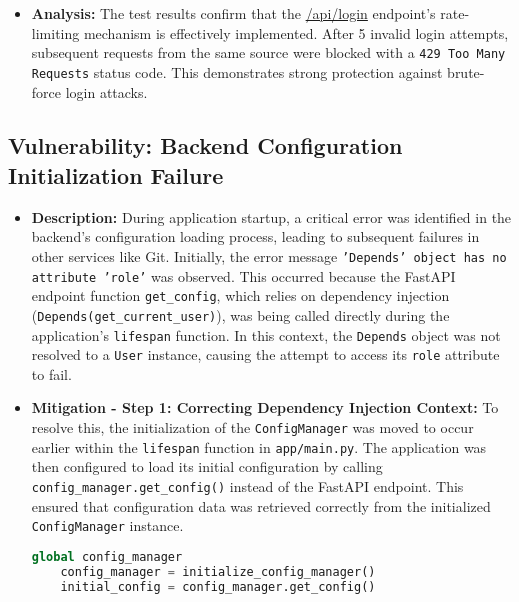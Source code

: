 \documentclass{article}
\begin{document}
\begin{itemize}
    \item \textbf{Analysis:}
    The test results confirm that the \url{/api/login} endpoint's rate-limiting mechanism is effectively implemented. After 5 invalid login attempts, subsequent requests from the same source were blocked with a \texttt{429 Too Many Requests} status code. This demonstrates strong protection against brute-force login attacks.
\end{itemize}

\subsection{\textbf{Vulnerability: Backend Configuration Initialization Failure}}
\begin{itemize}
    \item \textbf{Description:}
    During application startup, a critical error was identified in the backend's configuration loading process, leading to subsequent failures in other services like Git. Initially, the error message \texttt{'Depends' object has no attribute 'role'} was observed. This occurred because the FastAPI endpoint function \texttt{get\_config}, which relies on dependency injection (\texttt{Depends(get\_current\_user)}), was being called directly during the application's \texttt{lifespan} function. In this context, the \texttt{Depends} object was not resolved to a \texttt{User} instance, causing the attempt to access its \texttt{role} attribute to fail.
    \item \textbf{Mitigation - Step 1: Correcting Dependency Injection Context:}
    To resolve this, the initialization of the \texttt{ConfigManager} was moved to occur earlier within the \texttt{lifespan} function in \texttt{app/main.py}. The application was then configured to load its initial configuration by calling \texttt{config\_manager.get\_config()} instead of the FastAPI endpoint. This ensured that configuration data was retrieved correctly from the initialized \texttt{ConfigManager} instance.

    \begin{lstlisting}[language=Python, caption=Partial Fix for Config Loading in \texttt{app/main.py}]
    global config_manager
    config_manager = initialize_config_manager()
    initial_config = config_manager.get_config()
    \end{lstlisting}


\end{itemize}
\end{document}
